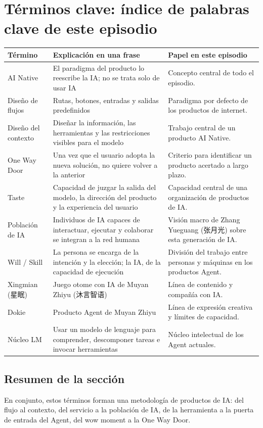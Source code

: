 \section{Términos clave: índice de palabras clave de este episodio}

\begin{longtable}{p{}p{}p{}}
\toprule
Término & Explicación en una frase & Papel en este episodio \\
\midrule
AI Native & El paradigma del producto lo reescribe la IA; no se trata solo de usar IA & Concepto central de todo el episodio. \\
Diseño de flujos & Rutas, botones, entradas y salidas predefinidos & Paradigma por defecto de los productos de internet. \\
Diseño del contexto & Diseñar la información, las herramientas y las restricciones visibles para el modelo & Trabajo central de un producto AI Native. \\
One Way Door & Una vez que el usuario adopta la nueva solución, no quiere volver a la anterior & Criterio para identificar un producto acertado a largo plazo. \\
Taste & Capacidad de juzgar la salida del modelo, la dirección del producto y la experiencia del usuario & Capacidad central de una organización de productos de IA. \\
Población de IA & Individuos de IA capaces de interactuar, ejecutar y colaborar se integran a la red humana & Visión macro de Zhang Yueguang (张月光) sobre esta generación de IA. \\
Will / Skill & La persona se encarga de la intención y la elección; la IA, de la capacidad de ejecución & División del trabajo entre personas y máquinas en los productos Agent. \\
Xingmian (星眠) & Juego otome con IA de Muyan Zhiyu (沐言智语) & Línea de contenido y compañía con IA. \\
Dokie & Producto Agent de Muyan Zhiyu & Línea de expresión creativa y límites de capacidad. \\
Núcleo LM & Usar un modelo de lenguaje para comprender, descomponer tareas e invocar herramientas & Núcleo intelectual de los Agent actuales. \\
\bottomrule
\end{longtable}

\subsection{Resumen de la sección}

En conjunto, estos términos forman una metodología de productos de IA: del flujo al contexto, del servicio a la población de IA, de la herramienta a la puerta de entrada del Agent, del wow moment a la One Way Door.

